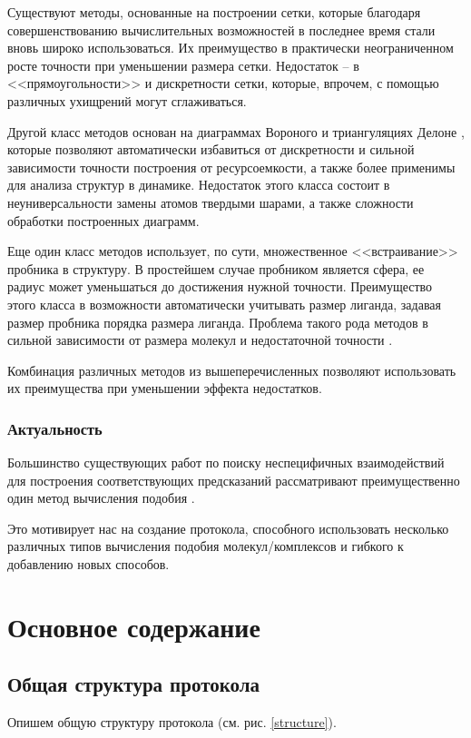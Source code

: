 \documentclass[a4paper,14pt]{article}         %
\begin{document}
Существуют методы, основанные на построении сетки, которые благодаря совершенствованию вычислительных возможностей в последнее время стали вновь широко использоваться. Их преимущество в практически неограниченном росте точности при уменьшении размера сетки. Недостаток -- в <<прямоугольности>> и дискретности сетки, которые, впрочем, с помощью различных ухищрений могут сглаживаться.

Другой класс методов основан на диаграммах Вороного и триангуляциях Делоне \cite{Aurenhammer1991}, которые позволяют автоматически избавиться от дискретности и сильной зависимости точности построения от ресурсоемкости, а также более применимы для анализа структур в динамике. Недостаток этого класса состоит в неуниверсальности замены атомов твердыми шарами, а также сложности обработки построенных диаграмм.

Еще один класс методов использует, по сути, множественное <<встраивание>> пробника в структуру. В простейшем случае пробником является сфера, ее радиус может уменьшаться до достижения нужной точности. Преимущество этого класса в возможности автоматически учитывать размер лиганда, задавая размер пробника порядка размера лиганда. Проблема такого рода методов в сильной зависимости от размера молекул и недостаточной точности \cite{Krone2016}.

Комбинация различных методов из вышеперечисленных позволяют использовать их преимущества при уменьшении эффекта недостатков.
\subsubsection{Актуальность}
Большинство существующих работ по поиску неспецифичных взаимодействий для построения соответствующих предсказаний рассматривают преимущественно один метод вычисления подобия \cite{Santos2016, Chartier2017}.
 
Это мотивирует нас на создание протокола, способного использовать несколько различных типов вычисления подобия молекул/комплексов и гибкого к добавлению новых способов.



\newpage
\section{Основное содержание}
\subsection{Общая структура протокола}
Опишем общую структуру протокола (см. рис. \ref{structure}).
\end{document}
